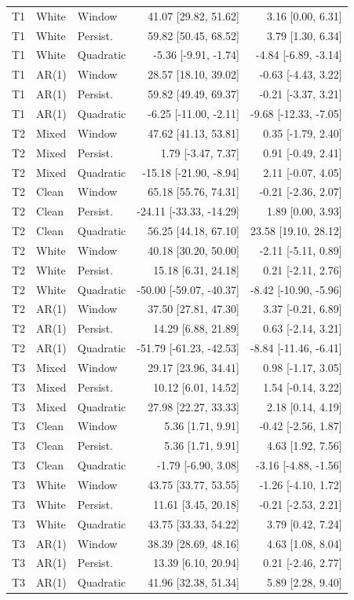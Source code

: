 \documentclass[10pt]{article}
\begin{document}
\begin{longtable}{lllrr}
T1 & White & Window & 41.07 [29.82, 51.62] & 3.16 [0.00, 6.31] \\
T1 & White & Persist. & 59.82 [50.45, 68.52] & 3.79 [1.30, 6.34] \\
T1 & White & Quadratic & -5.36 [-9.91, -1.74] & -4.84 [-6.89, -3.14] \\
T1 & AR(1) & Window & 28.57 [18.10, 39.02] & -0.63 [-4.43, 3.22] \\
T1 & AR(1) & Persist. & 59.82 [49.49, 69.37] & -0.21 [-3.37, 3.21] \\
T1 & AR(1) & Quadratic & -6.25 [-11.00, -2.11] & -9.68 [-12.33, -7.05] \\
T2 & Mixed & Window & 47.62 [41.13, 53.81] & 0.35 [-1.79, 2.40] \\
T2 & Mixed & Persist. & 1.79 [-3.47, 7.37] & 0.91 [-0.49, 2.41] \\
T2 & Mixed & Quadratic & -15.18 [-21.90, -8.94] & 2.11 [-0.07, 4.05] \\
T2 & Clean & Window & 65.18 [55.76, 74.31] & -0.21 [-2.36, 2.07] \\
T2 & Clean & Persist. & -24.11 [-33.33, -14.29] & 1.89 [0.00, 3.93] \\
T2 & Clean & Quadratic & 56.25 [44.18, 67.10] & 23.58 [19.10, 28.12] \\
T2 & White & Window & 40.18 [30.20, 50.00] & -2.11 [-5.11, 0.89] \\
T2 & White & Persist. & 15.18 [6.31, 24.18] & 0.21 [-2.11, 2.76] \\
T2 & White & Quadratic & -50.00 [-59.07, -40.37] & -8.42 [-10.90, -5.96] \\
T2 & AR(1) & Window & 37.50 [27.81, 47.30] & 3.37 [-0.21, 6.89] \\
T2 & AR(1) & Persist. & 14.29 [6.88, 21.89] & 0.63 [-2.14, 3.21] \\
T2 & AR(1) & Quadratic & -51.79 [-61.23, -42.53] & -8.84 [-11.46, -6.41] \\
T3 & Mixed & Window & 29.17 [23.96, 34.41] & 0.98 [-1.17, 3.05] \\
T3 & Mixed & Persist. & 10.12 [6.01, 14.52] & 1.54 [-0.14, 3.22] \\
T3 & Mixed & Quadratic & 27.98 [22.27, 33.33] & 2.18 [0.14, 4.19] \\
T3 & Clean & Window & 5.36 [1.71, 9.91] & -0.42 [-2.56, 1.87] \\
T3 & Clean & Persist. & 5.36 [1.71, 9.91] & 4.63 [1.92, 7.56] \\
T3 & Clean & Quadratic & -1.79 [-6.90, 3.08] & -3.16 [-4.88, -1.56] \\
T3 & White & Window & 43.75 [33.77, 53.55] & -1.26 [-4.10, 1.72] \\
T3 & White & Persist. & 11.61 [3.45, 20.18] & -0.21 [-2.53, 2.21] \\
T3 & White & Quadratic & 43.75 [33.33, 54.22] & 3.79 [0.42, 7.24] \\
T3 & AR(1) & Window & 38.39 [28.69, 48.16] & 4.63 [1.08, 8.04] \\
T3 & AR(1) & Persist. & 13.39 [6.10, 20.94] & 0.21 [-2.46, 2.77] \\
T3 & AR(1) & Quadratic & 41.96 [32.38, 51.34] & 5.89 [2.28, 9.40] \\
\bottomrule\end{longtable}\endgroup
\end{document}
